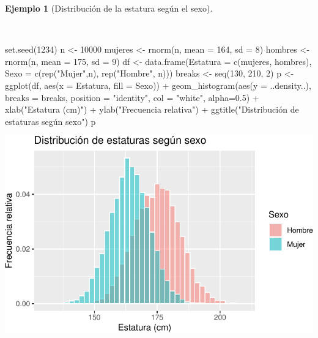 \documentclass[
  a4paper,
]{scrreport}
\newenvironment{Shaded}{\begin{snugshade}}{\end{snugshade}}
\newcommand{\AttributeTok}[1]{\textcolor[rgb]{0.40,0.45,0.13}{#1}}
\newcommand{\DecValTok}[1]{\textcolor[rgb]{0.68,0.00,0.00}{#1}}
\newcommand{\FloatTok}[1]{\textcolor[rgb]{0.68,0.00,0.00}{#1}}
\newcommand{\FunctionTok}[1]{\textcolor[rgb]{0.28,0.35,0.67}{#1}}
\newcommand{\NormalTok}[1]{\textcolor[rgb]{0.00,0.23,0.31}{#1}}
\newcommand{\OtherTok}[1]{\textcolor[rgb]{0.00,0.23,0.31}{#1}}
\newcommand{\SpecialCharTok}[1]{\textcolor[rgb]{0.37,0.37,0.37}{#1}}
\newcommand{\StringTok}[1]{\textcolor[rgb]{0.13,0.47,0.30}{#1}}
\theoremstyle{plain}
\theoremstyle{definition}
\newtheorem{example}{Ejemplo}[chapter]
\theoremstyle{definition}
\theoremstyle{remark}
\begin{document}
\begin{example}[Distribución de la estatura según el
sexo]\protect\hypertarget{exm-distribucion-estaturas-sexo}{}\label{exm-distribucion-estaturas-sexo}

~

\begin{Shaded}
\begin{Highlighting}[]
\FunctionTok{set.seed}\NormalTok{(}\DecValTok{1234}\NormalTok{)}
\NormalTok{n }\OtherTok{\textless{}{-}} \DecValTok{10000}
\NormalTok{mujeres }\OtherTok{\textless{}{-}} \FunctionTok{rnorm}\NormalTok{(n, }\AttributeTok{mean =} \DecValTok{164}\NormalTok{, }\AttributeTok{sd =} \DecValTok{8}\NormalTok{)}
\NormalTok{hombres }\OtherTok{\textless{}{-}} \FunctionTok{rnorm}\NormalTok{(n, }\AttributeTok{mean =} \DecValTok{175}\NormalTok{, }\AttributeTok{sd =} \DecValTok{9}\NormalTok{)}
\NormalTok{df }\OtherTok{\textless{}{-}} \FunctionTok{data.frame}\NormalTok{(}\AttributeTok{Estatura =} \FunctionTok{c}\NormalTok{(mujeres, hombres), }\AttributeTok{Sexo =} \FunctionTok{c}\NormalTok{(}\FunctionTok{rep}\NormalTok{(}\StringTok{"Mujer"}\NormalTok{,n), }\FunctionTok{rep}\NormalTok{(}\StringTok{"Hombre"}\NormalTok{, n)))}
\NormalTok{breaks }\OtherTok{\textless{}{-}} \FunctionTok{seq}\NormalTok{(}\DecValTok{130}\NormalTok{, }\DecValTok{210}\NormalTok{, }\DecValTok{2}\NormalTok{)}
\NormalTok{p }\OtherTok{\textless{}{-}} \FunctionTok{ggplot}\NormalTok{(df, }\FunctionTok{aes}\NormalTok{(}\AttributeTok{x =}\NormalTok{ Estatura, }\AttributeTok{fill =}\NormalTok{ Sexo)) }\SpecialCharTok{+}
    \FunctionTok{geom\_histogram}\NormalTok{(}\FunctionTok{aes}\NormalTok{(}\AttributeTok{y =}\NormalTok{ ..density..), }\AttributeTok{breaks =}\NormalTok{ breaks, }\AttributeTok{position =} \StringTok{"identity"}\NormalTok{, }\AttributeTok{col =} \StringTok{"white"}\NormalTok{, }\AttributeTok{alpha=}\FloatTok{0.5}\NormalTok{) }\SpecialCharTok{+}
    \FunctionTok{xlab}\NormalTok{(}\StringTok{"Estatura (cm)"}\NormalTok{) }\SpecialCharTok{+}
    \FunctionTok{ylab}\NormalTok{(}\StringTok{"Frecuencia relativa"}\NormalTok{) }\SpecialCharTok{+}
    \FunctionTok{ggtitle}\NormalTok{(}\StringTok{"Distribución de estaturas según sexo"}\NormalTok{)}
\NormalTok{p}
\end{Highlighting}
\end{Shaded}

\includegraphics{02-estadistica-descriptiva_files/figure-pdf/histograma-estatura-sexo-1.pdf}


\end{example}
\end{document}
